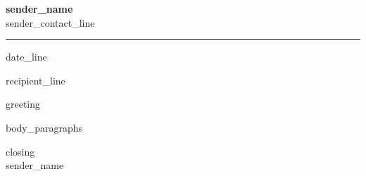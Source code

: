 \documentclass[11pt,a4paper]{article}
\begin{document}
\begin{center}
  {\Huge\bfseries\color{accent} {{sender_name}}}\\[4pt]
  {\small\color{muted} {{sender_contact_line}}}
\end{center}

\vspace{6pt}
\noindent\color{accent}\hrule\color{black}
\vspace{6pt}

\begin{flushright}
  {{date_line}}
\end{flushright}

{{recipient_line}}

\vspace{6pt}

{{greeting}}

{{body_paragraphs}}

{{closing}}\\[24pt]
{{sender_name}}
\end{document}
